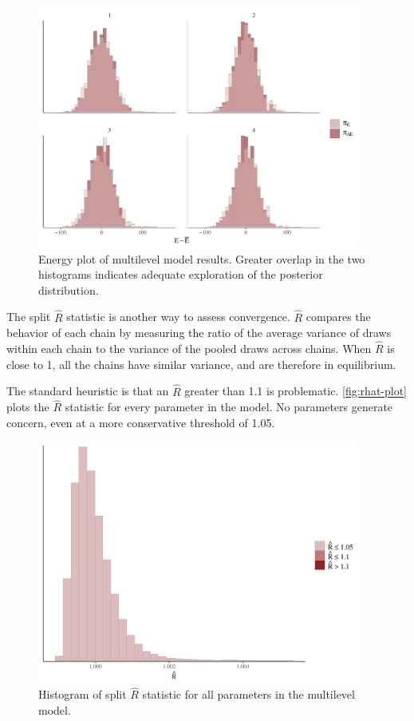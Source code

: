 \documentclass[12pt]{article}
\begin{document}
\begin{figure}
	\centering
		\includegraphics[width=0.95\textwidth]{energy-plot.pdf}
	\caption{Energy plot of multilevel model results. Greater overlap in the two histograms indicates adequate exploration of the posterior distribution. }
	\label{fig:energy-plot}
\end{figure}


The split $\hat{R}$ statistic is another way to assess convergence. 
$\hat{R}$ compares the behavior of each chain by measuring the ratio of the average variance of draws within each chain to the variance of the pooled draws across chains. 
When $\hat{R}$ is close to 1, all the chains have similar variance, and are therefore in equilibrium. 


The standard heuristic is that an $\hat{R}$ greater than 1.1 is problematic. 
\autoref{fig:rhat-plot} plots the $\hat{R}$ statistic for every parameter in the model. 
No parameters generate concern, even at a more conservative threshold of 1.05. 


\begin{figure}[htbp]
	\centering
		\includegraphics[width=0.95\textwidth]{rhat-plot.pdf}
	\caption{Histogram of split $\hat{R}$ statistic for all parameters in the multilevel model.}
	\label{fig:rhat-plot}
\end{figure}
 
\end{document}
